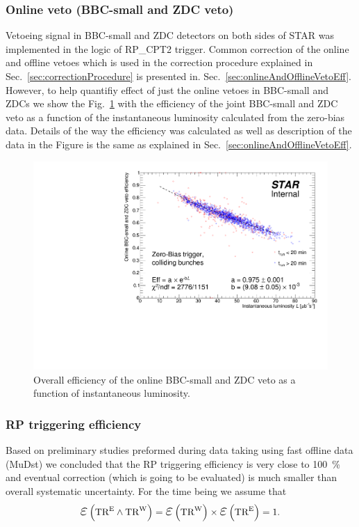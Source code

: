 \subsubsection{Online veto (BBC-small and ZDC veto)}\label{sec:onlineVetoEff}

Vetoeing signal in BBC-small and ZDC detectors on both sides of STAR was implemented in the logic of RP\_CPT2 trigger. Common correction of the online and offline vetoes which is used in the correction procedure explained in Sec.~\ref{sec:correctionProcedure} is presented in. Sec.~\ref{sec:onlineAndOfflineVetoEff}. However, to help quantifiy effect of just the online vetoes in BBC-small and ZDCs we show the Fig.~\ref{fig:onlineVetoEff} with the efficiency of the joint BBC-small and ZDC veto as a function of the instantaneous luminosity calculated from the zero-bias data. Details of the way the efficiency was calculated as well as description of the data in the Figure is the same as explained in Sec.~\ref{sec:onlineAndOfflineVetoEff}.
\begin{figure}[ht!]
\centering%
\includegraphics[width=0.65\linewidth,page=1]{graphics/corrections/OnlineVetoEffVsInstLumi_graph.pdf}%
\caption{Overall efficiency of the online BBC-small and ZDC veto as a function of instantaneous luminosity.}\label{fig:onlineVetoEff}%
\end{figure}

\subsubsection{RP triggering efficiency}\label{sec:rpTrigEff}

Based on preliminary studies preformed during data taking using fast offline data (MuDst) we concluded that the RP triggering efficiency is very close to 100~\% and eventual correction (which is going to be evaluated) is much smaller than overall systematic uncertainty. For the time being we assume that
\begin{equation}
\mbox{\LARGE$\varepsilon$}\left(\TRE\land\TRW\right) =  \mbox{\LARGE$\varepsilon$}\left(\TRW\right) \times \mbox{\LARGE$\varepsilon$}\left(\TRE\right) = 1.
\end{equation}


